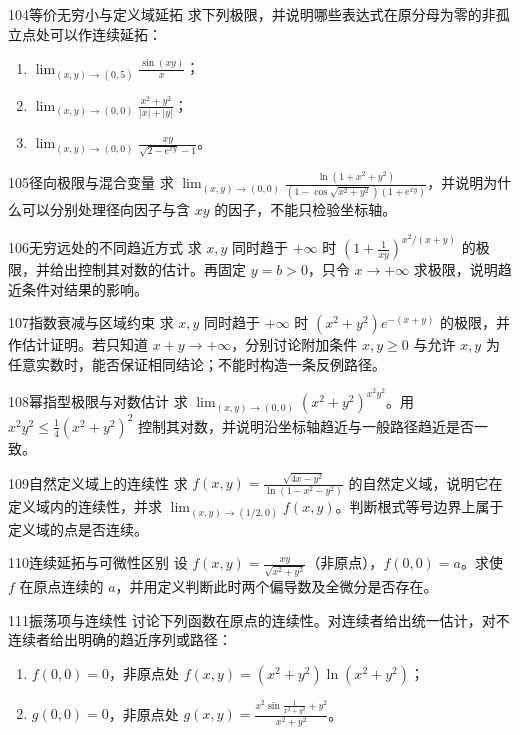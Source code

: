 \begin{exercise}{104}{等价无穷小与定义域延拓}
求下列极限，并说明哪些表达式在原分母为零的非孤立点处可以作连续延拓：
\begin{enumerate}
\item $\lim_{(x,y)\to(0,5)}\frac{\sin(xy)}x$；
\item $\lim_{(x,y)\to(0,0)}\frac{x^2+y^2}{|x|+|y|}$；
\item $\lim_{(x,y)\to(0,0)}\frac{xy}{\sqrt{2-e^{xy}}-1}$。
\end{enumerate}
\end{exercise}
\begin{exercise}{105}{径向极限与混合变量}
求 $\lim_{(x,y)\to(0,0)}\frac{\ln(1+x^2+y^2)}{(1-\cos\sqrt{x^2+y^2})(1+e^{xy})}$，并说明为什么可以分别处理径向因子与含 $xy$ 的因子，不能只检验坐标轴。
\end{exercise}
\begin{exercise}{106}{无穷远处的不同趋近方式}
求 $x,y$ 同时趋于 $+\infty$ 时 $\left(1+\frac1{xy}\right)^{x^2/(x+y)}$ 的极限，并给出控制其对数的估计。再固定 $y=b>0$，只令 $x\to+\infty$ 求极限，说明趋近条件对结果的影响。
\end{exercise}
\begin{exercise}{107}{指数衰减与区域约束}
求 $x,y$ 同时趋于 $+\infty$ 时 $(x^2+y^2)e^{-(x+y)}$ 的极限，并作估计证明。若只知道 $x+y\to+\infty$，分别讨论附加条件 $x,y\ge0$ 与允许 $x,y$ 为任意实数时，能否保证相同结论；不能时构造一条反例路径。
\end{exercise}
\begin{exercise}{108}{幂指型极限与对数估计}
求 $\lim_{(x,y)\to(0,0)}(x^2+y^2)^{x^2y^2}$。用 $x^2y^2\le\frac14(x^2+y^2)^2$ 控制其对数，并说明沿坐标轴趋近与一般路径趋近是否一致。
\end{exercise}
\begin{exercise}{109}{自然定义域上的连续性}
求 $f(x,y)=\frac{\sqrt{4x-y^2}}{\ln(1-x^2-y^2)}$ 的自然定义域，说明它在定义域内的连续性，并求 $\lim_{(x,y)\to(1/2,0)}f(x,y)$。判断根式等号边界上属于定义域的点是否连续。
\end{exercise}
\begin{exercise}{110}{连续延拓与可微性区别}
设 $f(x,y)=\frac{xy}{\sqrt{x^2+y^2}}$（非原点），$f(0,0)=a$。求使 $f$ 在原点连续的 $a$，并用定义判断此时两个偏导数及全微分是否存在。
\end{exercise}
\begin{exercise}{111}{振荡项与连续性}
讨论下列函数在原点的连续性。对连续者给出统一估计，对不连续者给出明确的趋近序列或路径：
\begin{enumerate}
\item $f(0,0)=0$，非原点处 $f(x,y)=(x^2+y^2)\ln(x^2+y^2)$；
\item $g(0,0)=0$，非原点处 $g(x,y)=\frac{x^2\sin\frac1{x^2+y^2}+y^2}{x^2+y^2}$。
\end{enumerate}
\end{exercise}
